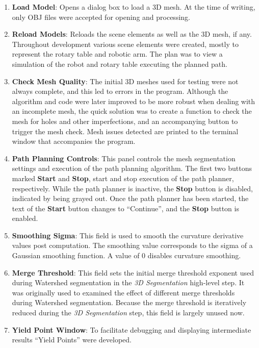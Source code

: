 \begin{enumerate}
	\item \textbf{Load Model}: Opens a dialog box to load a 3D mesh.
		At the time of writing, only OBJ files were accepted for opening and processing.
	\item \textbf{Reload Models}: Reloads the scene elements as well as the 3D mesh, if any.
		Throughout development various scene elements were created, mostly to represent the rotary table and robotic arm.
		The plan was to view a simulation of the robot and rotary table executing the planned path.
	\item \textbf{Check Mesh Quality}: The initial 3D meshes used for testing were not always complete, and this led to errors in the program.
		Although the algorithm and code were later improved to be more robust when dealing with an incomplete mesh, the quick solution was to create a function to check the mesh for holes and other imperfections, and an accompanying button to trigger the mesh check.
		Mesh issues detected are printed to the terminal window that accompanies the program.
	\item \textbf{Path Planning Controls}: This panel controls the mesh segmentation settings and execution of the path planning algorithm.
		The first two buttons marked \textbf{Start} and \textbf{Stop}, start and stop execution of the path planner, respectively.
		While the path planner is inactive, the \textbf{Stop} button is disabled, indicated by being grayed out.
		Once the path planner has been started, the text of the \textbf{Start} button changes to ``Continue'', and the \textbf{Stop} button is enabled.
	\item \textbf{Smoothing Sigma}: This field is used to smooth the curvature derivative values post computation.
		The smoothing value corresponds to the sigma of a Gaussian smoothing function.
		A value of 0 disables curvature smoothing.
	\item \textbf{Merge Threshold}: This field sets the initial merge threshold exponent used during Watershed segmentation in the \textit{3D Segmentation} high-level step.
		It was originally used to examined the effect of different merge thresholds during Watershed segmentation.
		Because the merge threshold is iteratively reduced during the \textit{3D Segmentation} step, this field is largely unused now.
	\item \textbf{Yield Point Window}: To facilitate debugging and displaying intermediate results ``Yield Points'' were developed.

\end{enumerate}

